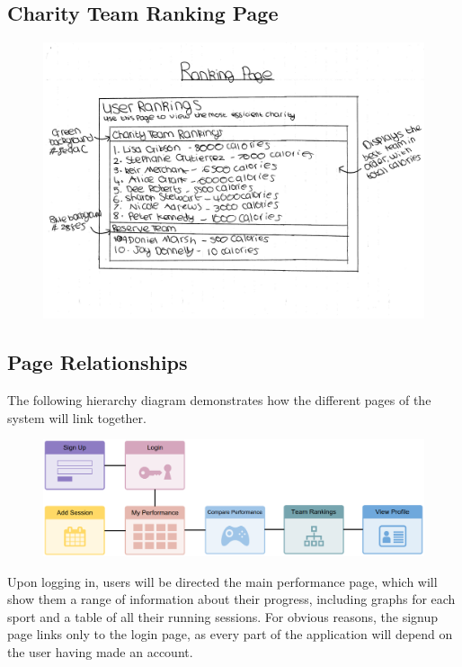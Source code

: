 \documentclass{article}[12pt,a4paper]
\begin{document}
\subsection{Charity Team Ranking Page}
\begin{figure}[h!]
  \includegraphics[scale=0.55]{design_ui/rankings}
\end{figure}
\clearpage

\subsection{Page Relationships}
The following hierarchy diagram demonstrates how the different pages of the system will link together.

\begin{figure}[h!]
  \includegraphics[scale=0.265]{sitemap}
\end{figure}

\noindent
Upon logging in, users will be directed the main performance page, which will show them a range of information about their progress, including graphs for each sport and a table of all their running sessions. For obvious reasons, the signup page links only to the login page, as every part of the application will depend on the user having made an account.
\end{document}
